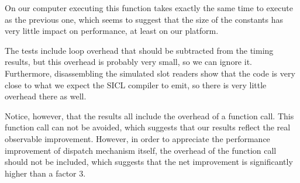 On our computer executing this function takes exactly the same time to
execute as the previous one, which seems to suggest that the size of
the constants has very little impact on performance, at least on our
platform.

The tests include loop overhead that should be subtracted from the
timing results, but this overhead is probably very small, so we can
ignore it.  Furthermore, disassembling the simulated slot readers show
that the code is very close to what we expect the SICL compiler to
emit, so there is very little overhead there as well.  

Notice, however, that the results all include the overhead of a
function call.  This function call can not be avoided, which suggests
that our results reflect the real observable improvement.  However,
in order to appreciate the performance improvement of dispatch
mechanism itself, the overhead of the function call should not be
included, which suggests that the net improvement is significantly
higher than a factor $3$. 



